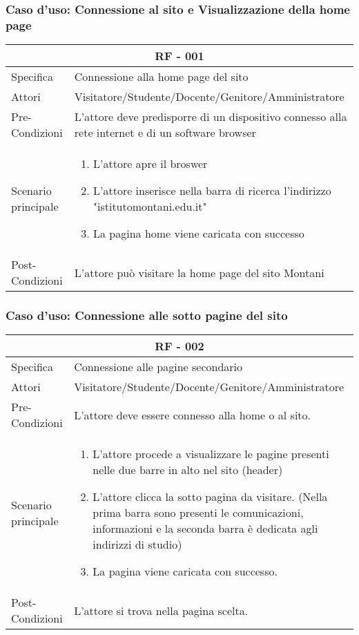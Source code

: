 \documentclass{article}
\begin{document}
\subsubsection{\textbf{Caso d'uso: Connessione al sito e Visualizzazione della home page}}
\begin{tabular}{ |p{3cm}|p{9cm}|  }
	\hline
	\multicolumn{2}{|c|}{\textbf{RF - 001}} \\
	\hline
	Specifica& Connessione alla home page del sito\\
	\hline
	Attori& Visitatore/Studente/Docente/Genitore/Amministratore\\
	\hline
	Pre-Condizioni& L'attore deve predisporre di un dispositivo connesso alla rete internet e di un software browser\\
	\hline
	Scenario principale& \begin{enumerate}
		\item L'attore apre il broswer
		\item L'attore inserisce nella barra di ricerca l'indirizzo "istitutomontani.edu.it"
		\item La pagina home viene caricata con successo
	\end{enumerate}\\
	\hline
	Post-Condizioni& L'attore può visitare la home page del sito Montani\\
	\hline
\end{tabular}
\clearpage
\subsubsection{\textbf{Caso d'uso: Connessione alle sotto pagine del sito}}
\begin{tabular}{ |p{3cm}|p{9cm}|  }
	\hline
	\multicolumn{2}{|c|}{\textbf{RF - 002}} \\
	\hline
	Specifica& Connessione alle pagine secondario\\
	\hline
	Attori& Visitatore/Studente/Docente/Genitore/Amministratore\\
	\hline
	Pre-Condizioni& L'attore deve essere connesso alla home o al sito.\\
	\hline
	Scenario principale& \begin{enumerate}
		\item L'attore procede a visualizzare le pagine presenti nelle due barre in alto nel sito (header)
		\item L'attore clicca la sotto pagina da visitare. (Nella prima barra sono presenti le comunicazioni, informazioni e la seconda barra è dedicata agli indirizzi di studio)
		\item La pagina viene caricata con successo.
	\end{enumerate}\\
	\hline
	Post-Condizioni& L'attore si trova nella pagina scelta.\\
	\hline
\end{tabular}
\end{document}
